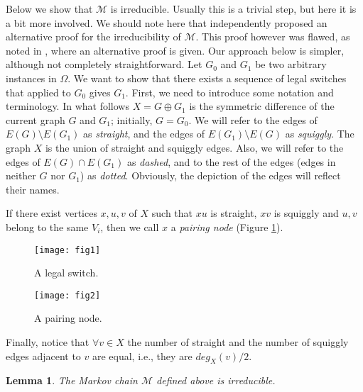 \documentclass[12pt,a4paper]{article}
\theoremstyle{definition}
\theoremstyle{plain}
\newtheorem{lemma}[dfn]{Lemma}
\begin{document}
Below we show that $\mathcal M$  is irreducible. Usually this is a trivial step,
but here it is a bit more involved. We should note here that 
\cite{SP12} independently proposed an alternative proof for the irreducibility of $\mathcal M$. This proof however was flawed, as noted in \cite{CDEM15}, where an alternative proof is given. Our approach below is simpler, although not completely straightforward.  Let $G_0$ and
$G_1$ be two arbitrary instances in $\Omega$. We want to show that there exists
a sequence of legal switches that applied to $G_0$ gives $G_1$. First, we need 
to introduce some notation and terminology. In what follows $X=G\oplus G_1$ is the symmetric
difference of the current graph $G$ and $G_1$; initially, $G=G_0$. We will refer 
to the edges of $E(G)\setminus E(G_1)$ as \emph{straight}, and the edges of 
$E(G_1)\setminus E(G)$ as \emph{squiggly}. The graph $X$ is the union of straight 
and squiggly edges. Also, we will refer to the edges of $E(G)\cap E(G_1)$ as
\emph{dashed}, and to the rest of the edges (edges in neither $G$ nor $G_1$) 
as \emph{dotted}. Obviously, the depiction of the edges will reflect their names.

If there exist vertices $x,u,v$ of $X$ such that $xu$ is straight, $xv$ is squiggly
and $u,v$ belong to the same $V_i$, then we call $x$ a \emph{pairing node} (Figure \ref{fig2}).

\begin{figure}[h]
\hspace{-0.5cm}
\begin{minipage}[b]{0.65\linewidth}
\centering
\texttt{[image: fig1]}
\caption{A legal switch.}
\label{fig1}
\end{minipage}
\hspace{-3cm}
\begin{minipage}[b]{0.65\linewidth}
\centering
\texttt{[image: fig2]}
\caption{A pairing node.}
\label{fig2}
\end{minipage}
\end{figure}

Finally, notice that $\forall v\in X$ the number of straight and the number of
squiggly edges adjacent to $v$ are equal, i.e., they are ${deg_X(v)}/{2}$.


\begin{lemma}
The Markov chain $\mathcal M$ defined above is irreducible.
\end{lemma}
\end{document}
